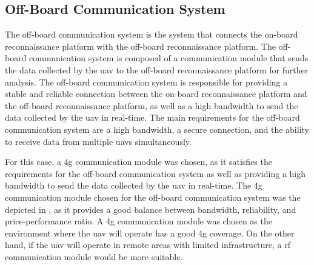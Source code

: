 
\subsection{Off-Board Communication System}\label{subsec:off-board_communication_system}

The off-board communication system is the system that connects the on-board reconnaissance platform with the off-board reconnaissance platform. The off-board communication system is composed of a communication module that sends the data collected by the \gls{uav} to the off-board reconnaissance platform for further analysis. The off-board communication system is responsible for providing a stable and reliable connection between the on-board reconnaissance platform and the off-board reconnaissance platform, as well as a high bandwidth to send the data collected by the \gls{uav} in real-time. The main requirements for the off-board communication system are a high bandwidth, a secure connection, and the ability to receive data from multiple \glspl{uav} simultaneously.

For this case, a \gls{4g} communication module was chosen, as it satisfies the requirements for the off-board communication system as well as providing a high bandwidth to send the data collected by the \gls{uav} in real-time. The \gls{4g} communication module chosen for the off-board communication system was the  depicted in , as it provides a good balance between bandwidth, reliability, and price-performance ratio. A \gls{4g} communication module was chosen as the environment where the \gls{uav} will operate has a good \gls{4g} coverage. On the other hand, if the \gls{uav} will operate in remote areas with limited infrastructure, a \gls{rf} communication module would be more suitable.

